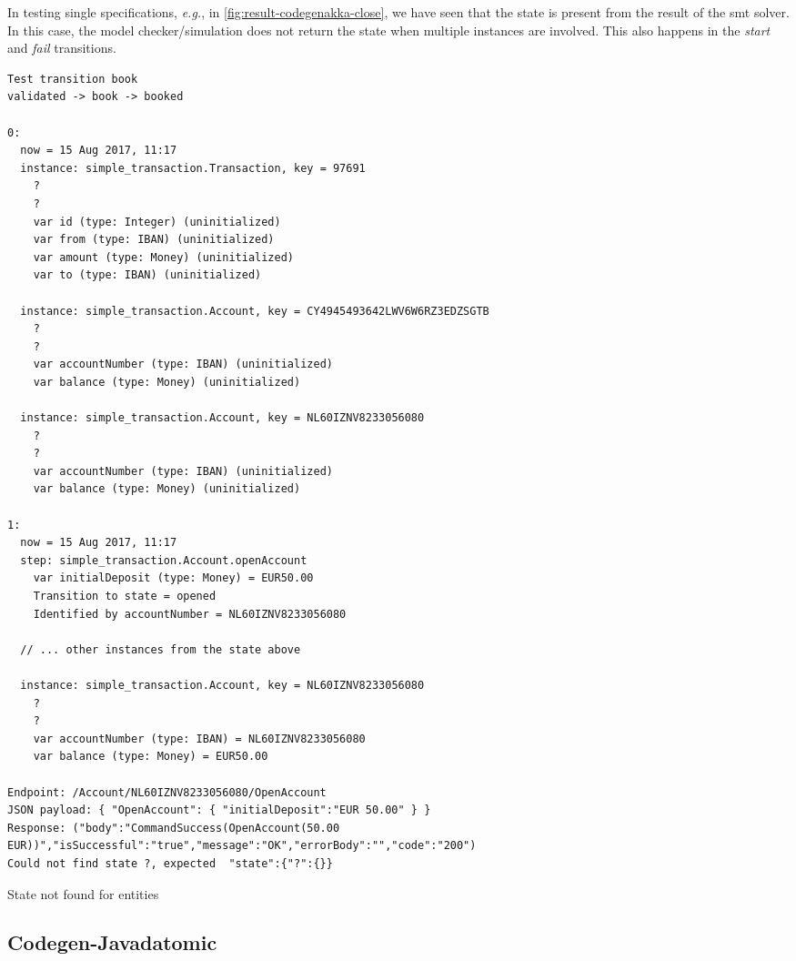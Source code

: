 In testing single specifications, \textit{e.g.}, in
\autoref{fig:result-codegenakka-close}, we have seen that the state is present
from the result of the \gls{smt} solver. In this case, the model checker/simulation
does not return the state when multiple instances are involved. This also
happens in the \textit{start} and \textit{fail} transitions.

\begin{sourcecode}[h!]
\begin{lstlisting}[]
Test transition book
validated -> book -> booked

0:
  now = 15 Aug 2017, 11:17
  instance: simple_transaction.Transaction, key = 97691
    ?
    ?
    var id (type: Integer) (uninitialized)
    var from (type: IBAN) (uninitialized)
    var amount (type: Money) (uninitialized)
    var to (type: IBAN) (uninitialized)

  instance: simple_transaction.Account, key = CY4945493642LWV6W6RZ3EDZSGTB
    ?
    ?
    var accountNumber (type: IBAN) (uninitialized)
    var balance (type: Money) (uninitialized)

  instance: simple_transaction.Account, key = NL60IZNV8233056080
    ?
    ?
    var accountNumber (type: IBAN) (uninitialized)
    var balance (type: Money) (uninitialized)

1:
  now = 15 Aug 2017, 11:17
  step: simple_transaction.Account.openAccount
    var initialDeposit (type: Money) = EUR50.00
    Transition to state = opened
    Identified by accountNumber = NL60IZNV8233056080

  // ... other instances from the state above

  instance: simple_transaction.Account, key = NL60IZNV8233056080
    ?
    ?
    var accountNumber (type: IBAN) = NL60IZNV8233056080
    var balance (type: Money) = EUR50.00

Endpoint: /Account/NL60IZNV8233056080/OpenAccount
JSON payload: { "OpenAccount": { "initialDeposit":"EUR 50.00" } }
Response: ("body":"CommandSuccess(OpenAccount(50.00 EUR))","isSuccessful":"true","message":"OK","errorBody":"","code":"200")
Could not find state ?, expected  "state":{"?":{}}
\end{lstlisting}
\caption{State not found for entities}\label{fig:result-not-found-state}
\end{sourcecode}
\FloatBarrier

\subsection{Codegen-Javadatomic}\label{sec:bug-interest-javadatomic}

